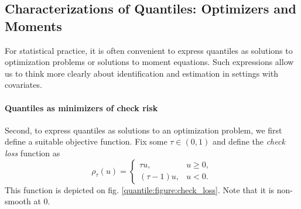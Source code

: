 
\subsection{Characterizations of Quantiles: Optimizers and Moments}

For statistical practice, it is often convenient to express quantiles as solutions to optimization problems or solutions to moment equations. 
%
Such expressions allow us to think more clearly about identification and estimation in settings with covariates. 



\paragraph{Quantiles as minimizers of check risk}

Second, to express quantiles as solutions to an optimization problem, we first define a suitable objective function.
Fix some $\tau \in (0, 1)$ and define the \emph{check loss} function as
\begin{equation}\label{quantile:equation:check_loss}
\rho_{\tau}(u) = \begin{cases}
	\tau u, & u \geq 0, \\
	(\tau-1)u, & u<0.
\end{cases}
\end{equation} 
This function is depicted on fig. \ref{quantile:figure:check_loss}. Note that it is non-smooth at 0.

